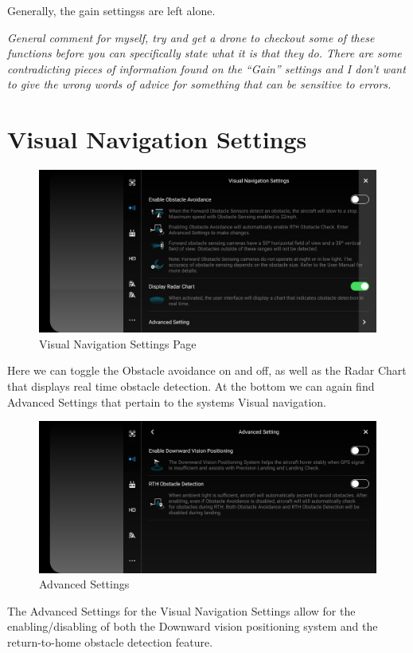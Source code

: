 \documentclass[
]{book}
\begin{document}
Generally, the gain settingss are left alone.

\emph{General comment for myself, try and get a drone to checkout some of these functions before you can specifically state what it is that they do. There are some contradicting pieces of information found on the ``Gain'' settings and I don't want to give the wrong words of advice for something that can be sensitive to errors.}

\hypertarget{visual-navigation-settings}{%
\section{Visual Navigation Settings}\label{visual-navigation-settings}}

\begin{figure}
\centering
\includegraphics{images/VN/DJI-VisualNavigationSettings.jpg}
\caption{Visual Navigation Settings Page}
\end{figure}

Here we can toggle the Obstacle avoidance on and off, as well as the Radar Chart that displays real time obstacle detection. At the bottom we can again find Advanced Settings that pertain to the systems Visual navigation.

\begin{figure}
\centering
\includegraphics{images/VN/DJI-VN-AdvancedSettings.jpg}
\caption{Advanced Settings}
\end{figure}

The Advanced Settings for the Visual Navigation Settings allow for the enabling/disabling of both the Downward vision positioning system and the return-to-home obstacle detection feature.
\end{document}
